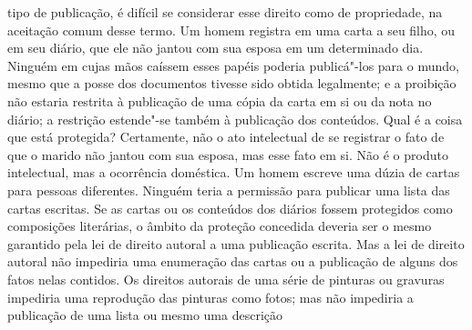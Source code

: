 tipo de publicação, é difícil se considerar esse direito como de
propriedade, na aceitação comum desse termo. Um homem registra em uma
carta a seu filho, ou em seu diário, que ele não jantou com sua esposa
em um determinado dia. Ninguém em cujas mãos caíssem esses papéis
poderia publicá"-los para o mundo, mesmo que a posse dos documentos
tivesse sido obtida legalmente; e a proibição não estaria restrita à
publicação de uma cópia da carta em si ou da nota no diário; a restrição
estende"-se também à publicação dos conteúdos. Qual é a coisa que está
protegida? Certamente, não o ato intelectual de se registrar o fato de
que o marido não jantou com sua esposa, mas esse fato em si. Não é o
produto intelectual, mas a ocorrência doméstica. Um homem escreve uma
dúzia de cartas para pessoas diferentes. Ninguém teria a permissão para
publicar uma lista das cartas escritas. Se as cartas ou os conteúdos dos
diários fossem protegidos como composições literárias, o âmbito da
proteção concedida deveria ser o mesmo garantido pela lei de direito
autoral a uma publicação escrita. Mas a lei de direito autoral não
impediria uma enumeração das cartas ou a publicação de alguns dos fatos
nelas contidos. Os direitos autorais de uma série de pinturas ou
gravuras impediria uma reprodução das pinturas como fotos; mas não
impediria a publicação de uma lista ou mesmo uma descrição
